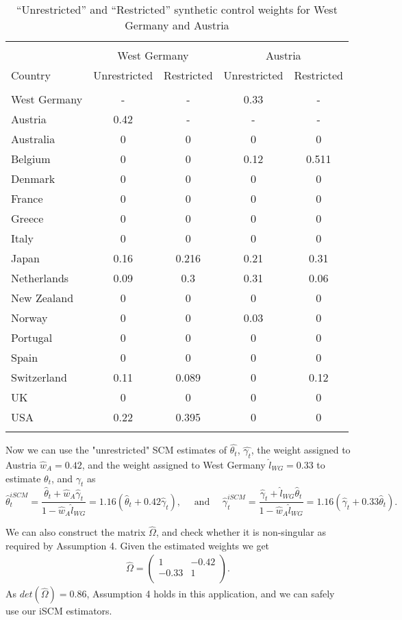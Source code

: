 \begin{table}[H]\centering 
\caption{``Unrestricted'' and ``Restricted'' synthetic control weights for West Germany and Austria} 
\label{WG} 
\begin{tabular}{@{\extracolsep{5pt}} lcccc} 
\\[-1.8ex]\hline 
\hline \\[-1.8ex] 
    &\multicolumn{2}{c}{West Germany } &\multicolumn{2}{c}{Austria} \\
  Country  &Unrestricted &Restricted&Unrestricted &Restricted\\
\hline \\[-1.8ex] 
West Germany&-&-&0.33&-\\
Austria&0.42&-&-&-\\
Australia&0&0&0&0\\
Belgium&0&0&0.12&0.511\\
Denmark&0&0&0&0\\
France&0&0&0&0\\
Greece&0&0&0&0\\
Italy&0&0&0&0\\
Japan&0.16&0.216&0.21&0.31\\
Netherlands&0.09&0.3&0.31&0.06\\
New Zealand&0&0&0&0\\
Norway&0&0&0.03&0\\
Portugal&0&0&0&0\\
Spain&0&0&0&0\\
Switzerland&0.11&0.089&0&0.12\\
UK&0&0&0&0\\
USA&0.22&0.395&0&0\\
\hline \\[-1.8ex] 
\end{tabular} 
\end{table}

Now we can use  the "unrestricted" SCM estimates of  $\widehat{\theta_{t}}$, $\widehat{\gamma_{t}}$, the weight assigned to Austria $\hat{w}_A=0.42$, and the weight assigned to West Germany $\hat{l}_{WG}=0.33$ to estimate $\theta_t$, and $\gamma_t$ as
 	 $$\widehat{\theta}_{t}^{iSCM}=\frac{\widehat{\theta}_{t}+\hat{w}_A\widehat{\gamma}_{t}}{1-\hat{w}_A\hat{l}_{WG}}=1.16\left(\widehat{\theta}_{t}+0.42\widehat{\gamma}_{t}\right), \quad \textrm{ and } \quad \widehat{\gamma}_{t}^{iSCM}=\frac{\widehat{\gamma}_{t}+\hat{l}_{WG}\widehat{\theta}_{t}}{1-\hat{w}_A\hat{l}_{WG}}=1.16\left(\widehat{\gamma}_{t}+0.33\widehat{\theta}_{t}\right).$$


We can also construct the matrix $\widehat{\Omega}$, and check whether it is non-singular as required by Assumption 4. Given the estimated weights we get 
\begin{align*}
\widehat{\Omega}=
\begin{pmatrix}
1 & - 0.42 \\
- 0.33 & 1 \\
\end{pmatrix}.
\end{align*}
As $det(\widehat{\Omega})=0.86$, Assumption 4 holds in this application, and we can safely use our iSCM estimators. 

